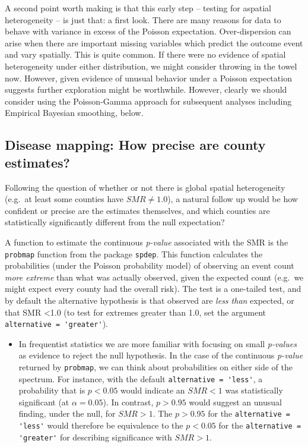 \documentclass[
]{book}
\newcommand{\passthrough}[1]{#1}
\newenvironment{rmdblock}[1]
  {%
  \begin{itemize}
  \renewcommand{\labelitemi}{
    \raisebox{-.7\height}[0pt][0pt]{
      {\setkeys{Gin}{width=3em,keepaspectratio}\texttt{[image: images/\#1]}}
    }
  }
  \item
  }
  {
  \end{itemize}
  }
\newenvironment{rmdnote}
  {\begin{rmdblock}{note}}
  {\end{rmdblock}}
\begin{document}
A second point worth making is that this early step -- testing for aspatial heterogeneity -- is just that: a first look. There are many reasons for data to behave with variance in excess of the Poisson expectation. Over-dispersion can arise when there are important missing variables which predict the outcome event and vary spatially. This is quite common. If there were no evidence of spatial heterogeneity under either distribution, we might consider throwing in the towel now. However, given evidence of unusual behavior under a Poisson expectation suggests further exploration might be worthwhile. However, clearly we should consider using the Poisson-Gamma approach for subsequent analyses including Empirical Bayesian smoothing, below.

\hypertarget{disease-mapping-how-precise-are-county-estimates}{%
\subsection{Disease mapping: How precise are county estimates?}\label{disease-mapping-how-precise-are-county-estimates}}

Following the question of whether or not there is global spatial heterogeneity (e.g.~at least some counties have \(SMR\neq 1.0\)), a natural follow up would be how confident or precise are the estimates themselves, and which counties are statistically significantly different from the null expectation?

A function to estimate the continuous \emph{p-value} associated with the SMR is the \passthrough{\lstinline!probmap!} function from the package \passthrough{\lstinline!spdep!}. This function calculates the probabilities (under the Poisson probability model) of observing an event count \emph{more extreme} than what was actually observed, given the expected count (e.g.~we might expect every county had the overall risk). The test is a one-tailed test, and by default the alternative hypothesis is that observed are \emph{less than} expected, or that SMR \textless1.0 (to test for extremes greater than 1.0, set the argument \passthrough{\lstinline!alternative = 'greater'!}).

\begin{rmdnote}
In frequentist statistics we are more familiar with focusing on small \emph{p-values} as evidence to reject the null hypothesis. In the case of the continuous \emph{p-value} returned by \passthrough{\lstinline!probmap!}, we can think about probabilities on either side of the spectrum. For instance, with the default \passthrough{\lstinline!alternative = 'less'!}, a probability that is \(p<0.05\) would indicate an \(SMR<1\) was statistically significant (at \(\alpha=0.05\)). In contrast, \(p>0.95\) would suggest an unusual finding, under the null, for \(SMR>1\). The \(p>0.95\) for the \passthrough{\lstinline!alternative = 'less'!} would therefore be equivalence to the \(p<0.05\) for the \passthrough{\lstinline!alternative = 'greater'!} for describing significance with \(SMR>1\).
\end{rmdnote}
\end{document}
